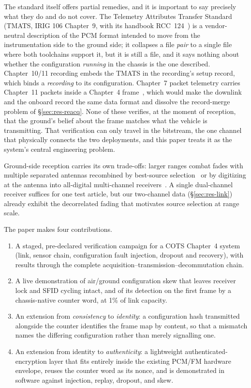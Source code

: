 \documentclass[12pt,letterpaper]{article}
\begin{document}
The standard itself offers partial remedies, and it is important to say precisely what
they do and do not cover. The Telemetry Attributes Transfer Standard (TMATS, IRIG 106
Chapter~9, with its handbook RCC~124~\cite{rcc124}) is a vendor-neutral description of the
PCM format intended to move from the instrumentation side to the ground side; it collapses
a file \emph{pair} to a single file where both toolchains support it, but it is still a
file, and it says nothing about whether the configuration \emph{running} in the chassis is
the one described. Chapter~10/11 recording embeds the TMATS in the recording's setup
record, which binds a \emph{recording} to its configuration. Chapter~7 packet telemetry
carries Chapter~11 packets inside a Chapter~4 frame~\cite{hoffman2019}, which would make
the downlink and the onboard record the same data format and dissolve the record-merge
problem of \S\ref{sec:res-reacq}. None of these verifies, at the moment of reception, that
the ground's belief about the frame matches what the vehicle is transmitting. That
verification can only travel in the bitstream, the one channel that physically connects
the two deployments, and this paper treats it as the system's central engineering problem.

Ground-side reception carries its own trade-offs: larger ranges combat fades with multiple
separated antennas recombined by best-source selection~\cite{bastie2022} or by digitizing
at the antenna into all-digital multi-channel receivers~\cite{bastie2024}. A single
dual-channel receiver suffices for one test article, but our two-channel data
(\S\ref{sec:res-link}) already exhibit the decorrelated fading that motivates source
selection at range scale.

The paper makes four contributions.
\begin{enumerate}
  \item A staged, pre-declared verification campaign for a COTS Chapter~4 system (link,
  sensor chain, configuration fault injection, dropout and recovery), with results through
  the complete acquisition--transmission--decommutation chain.
  \item A live demonstration of air/ground configuration skew that leaves receiver lock
  and SFID cycling intact, and of its detection on the first frame by a chassis-native
  counter word, at 1\% of link capacity.
  \item An extension from \emph{consistency} to \emph{identity}: a configuration hash
  transmitted alongside the counter identifies the frame map by content, so that a
  mismatch names the differing configuration rather than merely signalling one.
  \item An extension from identity to \emph{authenticity}: a lightweight
  authenticated-encryption layer that fits entirely inside the existing PCM/FM hardware
  envelope, reuses the counter word as its nonce, and is demonstrated in software against
  injection, replay, dropout, and skew.
\end{enumerate}
\end{document}
